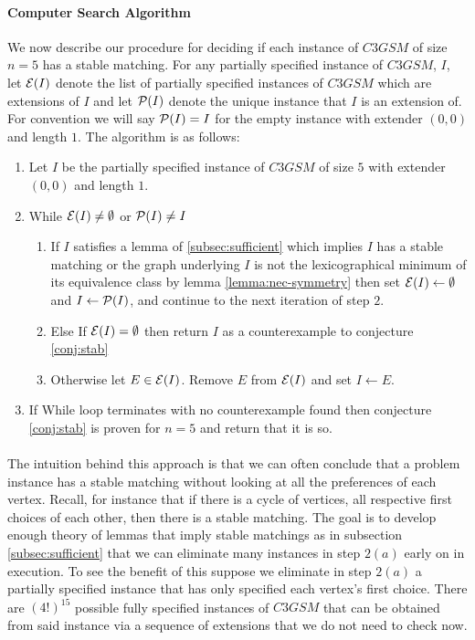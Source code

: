\paragraph{Computer Search Algorithm}
We now describe our procedure for deciding if each instance of $C3GSM$ of size $n=5$ has a stable matching. For any partially specified instance of $C3GSM$, $I$, let $\mathcal{E}(I)$ denote the list of partially specified instances of $C3GSM$ which are extensions of $I$ and let $\mathcal{P}(I)$ denote the unique instance that $I$ is an extension of. For convention we will say $\mathcal{P}(I) = I$ for the empty instance with extender $(0,0)$ and length $1$. The algorithm is as follows:
\begin{enumerate}
\item Let $I$ be the partially specified instance of $C3GSM$ of size $5$ with extender $(0,0)$ and length $1$.
\item While $\mathcal{E}(I) \neq \emptyset$ or $\mathcal{P}(I) \neq I$
	\begin{enumerate}
	\item If $I$ satisfies a lemma of \ref{subsec:sufficient} which implies $I$ has a stable matching or the graph underlying $I$ is not the lexicographical minimum of its equivalence class by lemma \ref{lemma:nec-symmetry} then set $\mathcal{E}(I) \leftarrow \emptyset$ and $I \leftarrow \mathcal{P}(I)$, and continue to the next iteration of step $2$.
	\item Else If $\mathcal{E}(I) = \emptyset$ then return $I$ as a counterexample to conjecture \ref{conj:stab}
	\item Otherwise let $E \in \mathcal{E}(I)$. Remove $E$ from $\mathcal{E}(I)$ and set $I \leftarrow E$. 
	\end{enumerate}
\item If While loop terminates with no counterexample found then conjecture \ref{conj:stab} is proven for $n=5$ and return that it is so.
\end{enumerate}
\paragraph{}
The intuition behind this approach is that we can often conclude that a problem instance has a stable matching without looking at all the preferences of each vertex. Recall, for instance that if there is a cycle of vertices, all respective first choices of each other, then there is a stable matching. The goal is to develop enough theory of lemmas that imply stable matchings as in subsection \ref{subsec:sufficient} that we can eliminate many instances in step $2(a)$ early on in execution. To see the benefit of this suppose we eliminate in step $2(a)$ a partially specified instance that has only specified each vertex's first choice. There are $(4!)^{15}$ possible fully specified instances of $C3GSM$ that can be obtained from said instance via a sequence of extensions that we do not need to check now.

